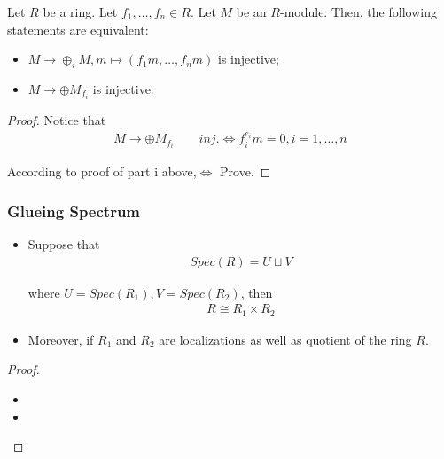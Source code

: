 \documentclass[Total.tex]{subfiles}
\begin{document}
			\begin{corollary}
				Let $R$ be a ring. Let $f_1,\dots,f_n\in R$. Let $M$ be an $R$-module. Then, the following statements are equivalent:
				\begin{itemize}
					\item $M\rightarrow \oplus_i M,m\mapsto (f_1m,\dots,f_nm)$ is injective;
					\item $M\rightarrow\oplus M_{f_i}$ is injective.
				\end{itemize}
			\end{corollary}
			\begin{proof}
				Notice that 
				\begin{gather*}
					M\rightarrow \oplus M_{f_i}\qquad inj.\Leftrightarrow  f_i^{e_i}m=0,i=1,\dots,n
				\end{gather*}
				
				According to proof of part i above,$\Leftrightarrow$ Prove.
			\end{proof}
			\subsubsection{Glueing Spectrum}
			\begin{lemma}
				\begin{itemize}
					\item Suppose that
					\begin{gather*}
						Spec(R)=U\sqcup V
					\end{gather*}
					
					where $U=Spec(R_1),V=Spec(R_2)$, then
					\begin{gather*}
						R\cong R_1\times R_2
					\end{gather*}
					
					\item Moreover, if $R_1$ and $R_2$ are localizations as well as quotient of the ring $R$.
				\end{itemize}
			\end{lemma}
			\begin{proof}
				\begin{itemize}
					\item 
					\item 
				\end{itemize}
			\end{proof}
\end{document}
